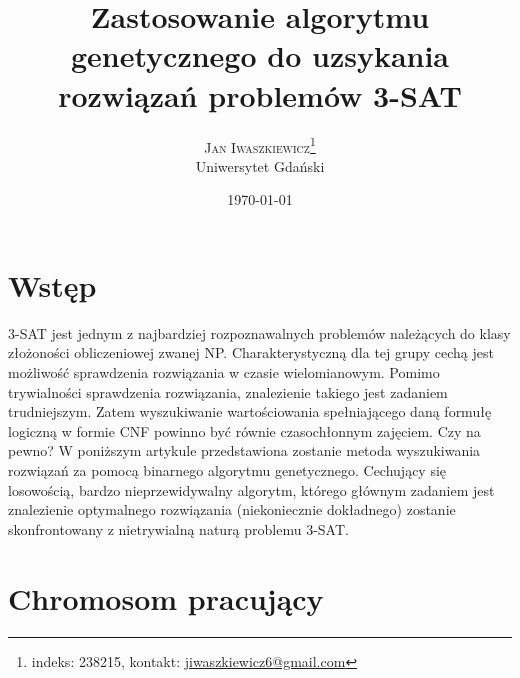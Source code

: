 \documentclass[twoside,twocolumn]{article}
\title{Zastosowanie algorytmu genetycznego do uzsykania rozwiązań problemów 3-SAT} %
\author{%
\textsc{Jan Iwaszkiewicz}\thanks{indeks: 238215, kontakt: \href{mailto:jiwaszkiewicz6@gmail.com}{jiwaszkiewicz6@gmail.com}} \\[1ex] %
\normalsize Uniwersytet Gdański \\ %
}
\date{\today} %
\begin{document}
\maketitle


\section{Wstęp}

\lettrine[nindent=0em,lines=3]{3} -SAT jest jednym z najbardziej rozpoznawalnych problemów
należących do klasy złożoności obliczeniowej zwanej NP. Charakterystyczną dla tej grupy
cechą jest możliwość sprawdzenia rozwiązania w czasie wielomianowym. Pomimo trywialności
sprawdzenia rozwiązania, znalezienie takiego jest zadaniem trudniejszym. Zatem wyszukiwanie
wartościowania spełniającego daną formułę logiczną w formie CNF powinno być równie czasochłonnym zajęciem.
Czy na pewno? W poniższym artykule przedstawiona zostanie metoda wyszukiwania rozwiązań za pomocą
binarnego algorytmu genetycznego. Cechujący się losowością, bardzo nieprzewidywalny algorytm, którego głównym zadaniem jest znalezienie optymalnego rozwiązania (niekoniecznie dokładnego) zostanie skonfrontowany z nietrywialną naturą problemu 3-SAT.

\section{Chromosom pracujący}
\end{document}
